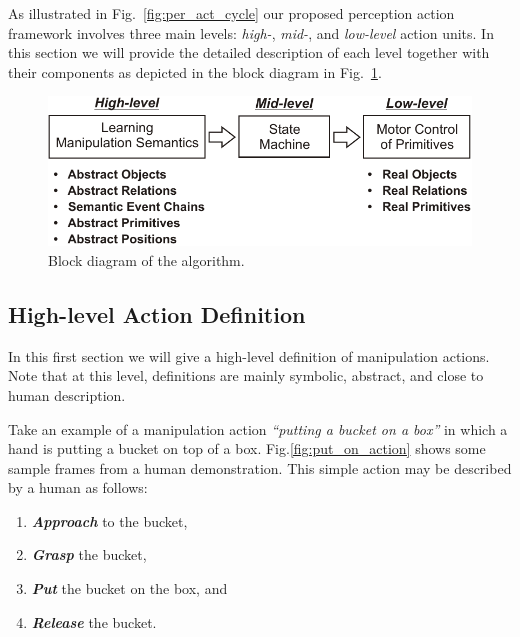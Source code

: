As illustrated in Fig.~\ref{fig:per_act_cycle} our proposed perception action framework involves three main levels: {\it high-}, {\it mid-}, and {\it low-level} action units. In this section we will provide the detailed description of each level together with their components as depicted in the block diagram in Fig.~\ref{fig:blockdiagram}.
  
  
 \begin{figure}[!t]
      \centering
      \includegraphics[scale=0.62]{./pdf/Figure_BlockDiagram.pdf}
      \caption{ Block diagram of the algorithm.}
      \label{fig:blockdiagram}
\end{figure}

 

\subsection{High-level Action Definition}
\label{sec:high-level}

In this first section we will give a high-level definition of manipulation actions. Note that at this level, definitions are mainly symbolic, abstract, and close to human description.


Take an example of a manipulation action   {\it ``putting a bucket on a box''} in which a hand is putting a bucket on top of a box.  Fig.\ref{fig:put_on_action} shows some sample frames from a human demonstration.
This simple action may be described by a human as follows:

\begin{enumerate}
  \item \textbf{\textit{Approach}} to the bucket,
  \item \textbf{\textit{Grasp}} the bucket,
  \item \textbf{\textit{Put}} the bucket on the box, and
  \item \textbf{\textit{Release}} the bucket.
\end{enumerate}

